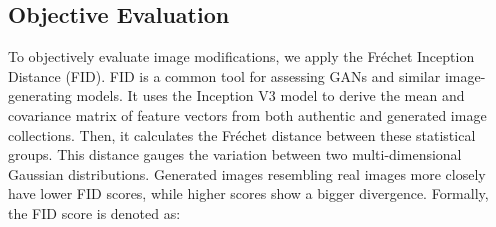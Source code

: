 \begin{spacing}{1.5}
\subsection{Objective Evaluation}
To objectively evaluate image modifications, we apply the Fréchet Inception Distance (FID). FID is a common tool for assessing GANs and similar image-generating models. It uses the Inception V3\cite{DBLP:conf/cvpr/SzegedyVISW16} model to derive the mean and covariance matrix of feature vectors from both authentic and generated image collections. Then, it calculates the Fréchet distance between these statistical groups. This distance gauges the variation between two multi-dimensional Gaussian distributions. Generated images resembling real images more closely have lower FID scores, while higher scores show a bigger divergence. Formally, the FID score is denoted as:


\end{spacing}
